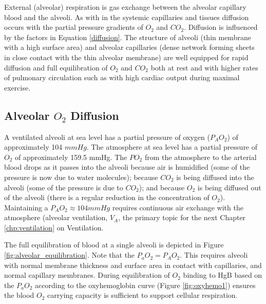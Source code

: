 External (alveolar) respiration is gas exchange between the alveolar capillary blood and the alveoli. As with in the systemic capillaries and tissues diffusion occurs with the partial pressure gradients of $O_2$ and $CO_2$. Diffusion is influenced by the factors in Equation \ref{diffusion}. The structure of alveoli (thin membrane with a high surface area) and alveolar capillaries (dense network forming sheets in close contact with the thin alveolar membrane) are well equipped for rapid diffusion and full equilibration of $O_2$ and $CO_2$ both at rest and with higher rates of pulmonary circulation such as with high cardiac output during maximal exercise.


\subsection{Alveolar $O_2$ Diffusion}

A ventilated alveoli at sea level has a partial pressure of oxygen ($P_AO_2$) of approximately 104 $mmHg$. The atmosphere at sea level has a partial pressure of $O_2$ of approximately 159.5 mmHg. The $PO_2$ from the atmosphere to the arterial blood drops as it passes into the alveoli because air is humidified (some of the pressure is now due to water molecules); because $CO_2$ is being diffused into the alveoli (some of the pressure is due to $CO_2$); and because $O_2$ is being diffused out of the alveoli (there is a regular reduction in the concentration of $O_2$). Maintaining a $P_AO_2 \approx 104 mmHg$ requires continuous air exchange with the atmosphere (alveolar ventilation, $V_A$, the primary topic for the next Chapter \ref{chp:ventilation} on Ventilation.

The full equilibration of blood at a single alveoli is depicted in Figure \ref{fig:alveolar_equilibration}. Note that the $P_aO_2 = P_AO_2$. This requires alveoli with normal membrane thickness and surface area in contact with capillaries, and normal capillary membranes. During equilibration of $O_2$ binding to HgB based on the $P_aO_2$ according to the oxyhemoglobin curve (Figure \ref{fig:oxyhemo1}) ensures the blood $O_2$ carrying capacity is sufficient to support cellular respiration. 

